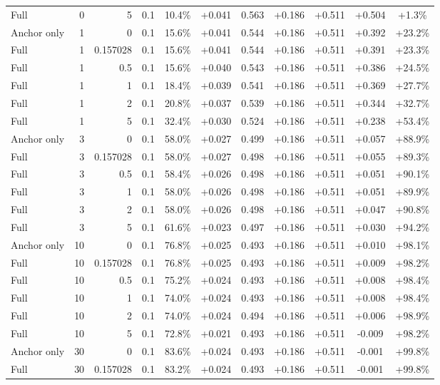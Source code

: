 \begin{table}[htbp]
\begin{tabular}{lrrrccccccc}
Full & 0 & 5 & 0.1 & 10.4\% & +0.041 & 0.563 & +0.186 & +0.511 & +0.504 & +1.3\% \\
Anchor only & 1 & 0 & 0.1 & 15.6\% & +0.041 & 0.544 & +0.186 & +0.511 & +0.392 & +23.2\% \\
Full & 1 & 0.157028 & 0.1 & 15.6\% & +0.041 & 0.544 & +0.186 & +0.511 & +0.391 & +23.3\% \\
Full & 1 & 0.5 & 0.1 & 15.6\% & +0.040 & 0.543 & +0.186 & +0.511 & +0.386 & +24.5\% \\
Full & 1 & 1 & 0.1 & 18.4\% & +0.039 & 0.541 & +0.186 & +0.511 & +0.369 & +27.7\% \\
Full & 1 & 2 & 0.1 & 20.8\% & +0.037 & 0.539 & +0.186 & +0.511 & +0.344 & +32.7\% \\
Full & 1 & 5 & 0.1 & 32.4\% & +0.030 & 0.524 & +0.186 & +0.511 & +0.238 & +53.4\% \\
Anchor only & 3 & 0 & 0.1 & 58.0\% & +0.027 & 0.499 & +0.186 & +0.511 & +0.057 & +88.9\% \\
Full & 3 & 0.157028 & 0.1 & 58.0\% & +0.027 & 0.498 & +0.186 & +0.511 & +0.055 & +89.3\% \\
Full & 3 & 0.5 & 0.1 & 58.4\% & +0.026 & 0.498 & +0.186 & +0.511 & +0.051 & +90.1\% \\
Full & 3 & 1 & 0.1 & 58.0\% & +0.026 & 0.498 & +0.186 & +0.511 & +0.051 & +89.9\% \\
Full & 3 & 2 & 0.1 & 58.0\% & +0.026 & 0.498 & +0.186 & +0.511 & +0.047 & +90.8\% \\
Full & 3 & 5 & 0.1 & 61.6\% & +0.023 & 0.497 & +0.186 & +0.511 & +0.030 & +94.2\% \\
Anchor only & 10 & 0 & 0.1 & 76.8\% & +0.025 & 0.493 & +0.186 & +0.511 & +0.010 & +98.1\% \\
Full & 10 & 0.157028 & 0.1 & 76.8\% & +0.025 & 0.493 & +0.186 & +0.511 & +0.009 & +98.2\% \\
Full & 10 & 0.5 & 0.1 & 75.2\% & +0.024 & 0.493 & +0.186 & +0.511 & +0.008 & +98.4\% \\
Full & 10 & 1 & 0.1 & 74.0\% & +0.024 & 0.493 & +0.186 & +0.511 & +0.008 & +98.4\% \\
Full & 10 & 2 & 0.1 & 74.0\% & +0.024 & 0.494 & +0.186 & +0.511 & +0.006 & +98.9\% \\
Full & 10 & 5 & 0.1 & 72.8\% & +0.021 & 0.493 & +0.186 & +0.511 & -0.009 & +98.2\% \\
Anchor only & 30 & 0 & 0.1 & 83.6\% & +0.024 & 0.493 & +0.186 & +0.511 & -0.001 & +99.8\% \\
Full & 30 & 0.157028 & 0.1 & 83.2\% & +0.024 & 0.493 & +0.186 & +0.511 & -0.001 & +99.8\% \\

\end{tabular}
\end{table}
